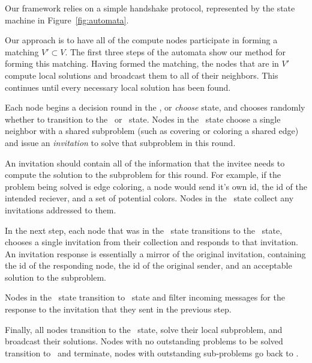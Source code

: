 
\label{sec:framework}
Our framework relies on a simple handshake protocol, represented by the state machine in Figure~\ref{fig:automata}.

Our approach is to have all of the compute nodes participate in forming a matching $V' \subset V$. The first three steps of the automata show our method for forming this matching. Having formed the matching, the nodes that are in $V'$ compute local solutions and broadcast them to all of their neighbors. This continues until every necessary local solution has been found. 


Each node begins a decision round in the \cCd, or {\em choose} state, and chooses randomly whether to transition to the \cId\ or \cLd\ state. Nodes in the \cId\ state choose a single neighbor with a shared subproblem (such as covering or coloring a shared edge) and issue an {\em invitation} to solve that subproblem in this round. 

An invitation should contain all of the information that the invitee needs to compute the solution to the subproblem for this round. For example, if the problem being solved is edge coloring, a node would send it's own id, the id of the intended reciever, and a set of potential colors. Nodes in the \cLd\ state collect any invitations addressed to them. 

In the next step, each node that was in the \cLd\ state transitions to the \cRd\ state, chooses a single invitation from their collection and responds to that invitation. An invitation response is essentially a mirror of the original invitation, containing the id of the responding node, the id of the original sender, and an acceptable solution to the subproblem. 

Nodes in the \cId\ state transition to \cWd\ state and filter incoming messages for the response to the invitation that they sent in the previous step. 

Finally, all nodes transition to the \cUd\ state, solve their local subproblem, and broadcast their solutions. Nodes with no outstanding problems to be solved transition to \cDd\ and terminate, nodes with outstanding sub-problems go back to \cCd.
